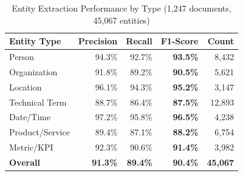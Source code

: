 \begin{table}[h]
\centering
\caption{Entity Extraction Performance by Type (1,247 documents, 45,067 entities)}
\label{tab:entity_extraction}
\begin{tabular}{lrrrr}
\toprule
\textbf{Entity Type} & \textbf{Precision} & \textbf{Recall} & \textbf{F1-Score} & \textbf{Count} \\
\midrule
Person              & 94.3\% & 92.7\% & \textbf{93.5\%} & 8,432 \\
Organization        & 91.8\% & 89.2\% & \textbf{90.5\%} & 5,621 \\
Location            & 96.1\% & 94.3\% & \textbf{95.2\%} & 3,147 \\
Technical Term      & 88.7\% & 86.4\% & \textbf{87.5\%} & 12,893 \\
Date/Time           & 97.2\% & 95.8\% & \textbf{96.5\%} & 4,238 \\
Product/Service     & 89.4\% & 87.1\% & \textbf{88.2\%} & 6,754 \\
Metric/KPI          & 92.3\% & 90.6\% & \textbf{91.4\%} & 3,982 \\
\midrule
\textbf{Overall}    & \textbf{91.3\%} & \textbf{89.4\%} & \textbf{90.4\%} & \textbf{45,067} \\
\bottomrule
\end{tabular}
\end{table}
